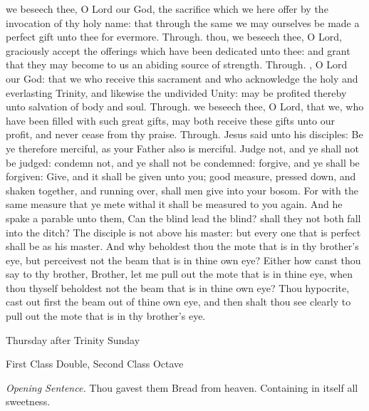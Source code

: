 \secret
{} we beseech thee, O Lord our God, the sacrifice which we here offer by the invocation of thy holy name: that through the same we may ourselves be made a perfect gift unto thee for evermore. Through.
 thou, we beseech thee, O Lord, graciously accept the offerings which have been dedicated unto thee: and grant that they may become to us an abiding source of strength. Through.
\postcommunion
{}, O Lord our God: that we who receive this sacrament and who acknowledge the holy and everlasting Trinity, and likewise the undivided Unity: may be profited thereby unto salvation of body and soul. Through.
 we beseech thee, O Lord, that we, who have been filled with such great gifts, may both receive these gifts unto our profit, and never cease from thy praise. Through.
 Jesus said unto his disciples: Be ye therefore merciful, as your Father also is merciful. Judge not, and ye shall not be judged: condemn not, and ye shall not be condemned: forgive, and ye shall be forgiven: Give, and it shall be given unto you; good measure, pressed down, and shaken together, and running over, shall men give into your bosom. For with the same measure that ye mete withal it shall be measured to you again. And he spake a parable unto them, Can the blind lead the blind? shall they not both fall into the ditch? The disciple is not above his master: but every one that is perfect shall be as his master. And why beholdest thou the mote that is in thy brother's eye, but perceivest not the beam that is in thine own eye? Either how canst thou say to thy brother, Brother, let me pull out the mote that is in thine eye, when thou thyself beholdest not the beam that is in thine own eye? Thou hypocrite, cast out first the beam out of thine own eye, and then shalt thou see clearly to pull out the mote that is in thy brother's eye.

\begin{inhead}
	{Thursday after Trinity Sunday}\par
    {First Class Double, Second Class Octave}
\end{inhead}
\par\noindent
\textit{Opening Sentence.} Thou gavest them Bread from heaven. Containing in itself all sweetness.

